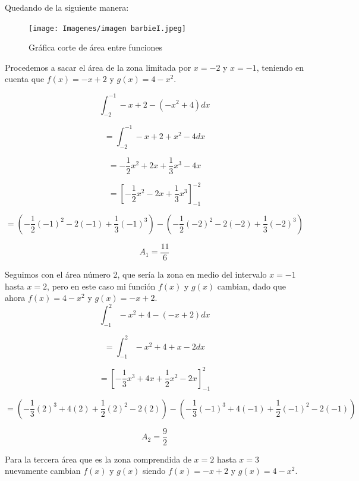 \documentclass[12pt]{article}
\begin{document}
\begin{flushleft}
Quedando de la siguiente manera:\\
\vspace{0.5cm}

\begin{figure}[H]
    \centering
    \texttt{[image: Imagenes/imagen barbieI.jpeg]}
    \caption{Gráfica corte de área entre funciones}
    \label{fig:enter-label}
\end{figure}



\newpage



Procedemos a sacar el área de la zona limitada por $x=-2$ y $x=-1$, teniendo en cuenta que  $f\left(x\right)=-x+2$ y $g\left(x\right)=4-x^{2}$.

$$\int_{-2}^{-1}-x+2-\left ( -x^{2}+4 \right )dx$$

$$=\int_{-2}^{-1}-x+2 + x^{2}-4 dx$$

$$=-\frac{1}{2}x^{2}+2x+\frac{1}{3}x^{3}-4x$$

$$=\left [-\frac{1}{2}x^{2}-2x+\frac{1}{3}x^{3} \right ]_{-1}^{-2}$$


$$=\left(-\frac{1}{2}\left ( -1\right )^{2}-2\left ( -1 \right )+\frac{1}{3}\left ( -1 \right )^{3}\right)-\left(-\frac{1}{2}\left ( -2\right )^{2}-2\left ( -2 \right )+\frac{1}{3}\left ( -2 \right )^{3}\right)$$

$$A_{1}=\frac{11}{6}$$

Seguimos con el área número 2, que sería la zona en medio del intervalo $x=-1$ hasta $x=2$, pero en este caso mi función $f\left(x\right)$ y $g\left(x\right)$ cambian, dado que ahora $f\left(x\right)=4-x^{2}$ y $g\left(x\right)=-x+2$.\\

$$\int_{-1}^{2}-x^{2}+4-\left ( -x+2 \right )dx$$

$$=\int_{-1}^{2}-x^{2}+4 + x-2dx$$

$$=\left [ -\frac{1}{3}x^{3}+4x+\frac{1}{2}x^{2}-2x \right ]_{-1}^{2}$$

$$=\left(-\frac{1}{3}\left ( 2 \right )^{3}+4\left ( 2 \right )+\frac{1}{2}\left ( 2 \right )^{2}-2\left ( 2 \right )\right)-\left(-\frac{1}{3}\left ( -1\right )^{3}+4\left ( -1 \right )+\frac{1}{2}\left ( -1 \right )^{2}-2\left ( -1 \right )\right)$$



$$A_{2}=\frac{9}{2}$$


Para la tercera área que es la zona comprendida de $x=2$ hasta $x=3$ nuevamente cambian $f\left(x\right)$ y $g\left(x\right)$ siendo  $f\left(x\right)=-x+2$ y $g\left(x\right)=4-x^{2}$.



\end{flushleft}
\end{document}
